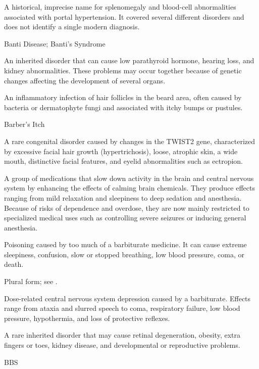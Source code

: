  A historical, imprecise name for splenomegaly and
blood-cell abnormalities associated with portal hypertension. It covered
several different disorders and does not identify a single modern diagnosis.

\synonyms
Banti Disease; Banti's Syndrome

 An inherited disorder that can cause low parathyroid hormone, hearing loss, and kidney abnormalities. These problems may occur together because of genetic changes affecting the development of several organs.

 An inflammatory infection of hair follicles in the beard area, often caused by bacteria or dermatophyte fungi and associated with itchy bumps or pustules.

\synonyms
Barber's Itch

 A rare congenital disorder caused by changes in the TWIST2 gene, characterized by excessive facial hair growth (hypertrichosis), loose, atrophic skin, a wide mouth, distinctive facial features, and eyelid abnormalities such as ectropion.

 A group of medications that slow down activity in the brain and central nervous system by enhancing the effects of calming brain chemicals. They produce effects ranging from mild relaxation and sleepiness to deep sedation and anesthesia. Because of risks of dependence and overdose, they are now mainly restricted to specialized medical uses such as controlling severe seizures or inducing general anesthesia.

 Poisoning caused by too much of a barbiturate medicine. It can cause extreme sleepiness, confusion, slow or stopped breathing, low blood pressure, coma, or death.

 Plural form; see .

 Dose-related central nervous system depression
caused by a barbiturate. Effects range from ataxia and slurred speech to coma,
respiratory failure, low blood pressure, hypothermia, and loss of protective
reflexes.

 A rare inherited disorder that may cause retinal degeneration, obesity, extra fingers or toes, kidney disease, and developmental or reproductive problems.

\synonyms
BBS

